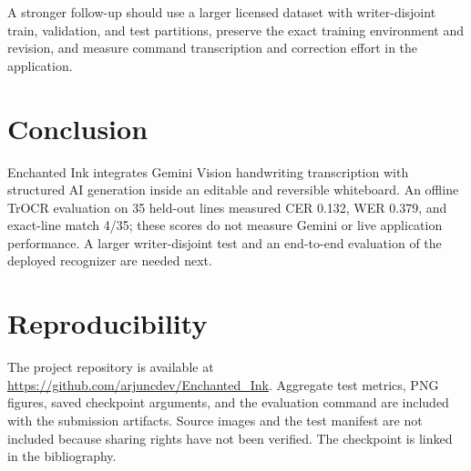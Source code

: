 \documentclass[conference]{IEEEtran}
\begin{document}
A stronger follow-up should use a larger licensed dataset with writer-disjoint train, validation, and test partitions, preserve the exact training environment and revision, and measure command transcription and correction effort in the application.

\section{Conclusion}
Enchanted Ink integrates Gemini Vision handwriting transcription with structured AI generation inside an editable and reversible whiteboard. An offline TrOCR evaluation on 35 held-out lines measured CER 0.132, WER 0.379, and exact-line match 4/35; these scores do not measure Gemini or live application performance. A larger writer-disjoint test and an end-to-end evaluation of the deployed recognizer are needed next.

\section*{Reproducibility}
The project repository is available at \url{https://github.com/arjuncdev/Enchanted_Ink}. Aggregate test metrics, PNG figures, saved checkpoint arguments, and the evaluation command are included with the submission artifacts. Source images and the test manifest are not included because sharing rights have not been verified. The checkpoint is linked in the bibliography. \balance



\end{document}
